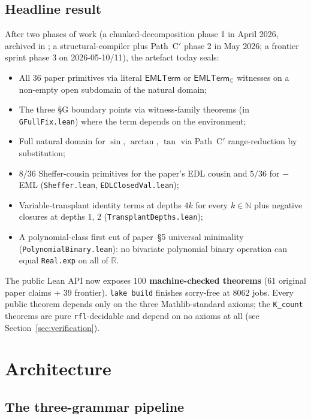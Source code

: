 \documentclass[11pt,a4paper]{article}
\theoremstyle{plain}
\theoremstyle{definition}
\newcommand{\C}{\mathbb{C}}
\newcommand{\R}{\mathbb{R}}
\newcommand{\N}{\mathbb{N}}
\newcommand{\EMLT}{\mathsf{EMLTerm}}
\newcommand{\EMLTC}{\mathsf{EMLTerm}_\C}
\begin{document}
\subsection{Headline result}

After two phases of work (a chunked-decomposition phase 1 in April
2026, archived in
; a structural-compiler
plus Path~C$'$ phase 2 in May 2026; a frontier sprint phase 3 on
2026-05-10/11), the artefact today seals:

\begin{itemize}[leftmargin=*]
  \item All $36$ paper primitives via literal $\EMLT$ or $\EMLTC$
    witnesses on a non-empty open subdomain of the natural domain;
  \item The three §G boundary points via witness-family theorems
    (in \texttt{GFullFix.lean}) where the term depends on the
    environment;
  \item Full natural domain for $\sin$, $\arctan$, $\tan$ via
    Path~C$'$ range-reduction by substitution;
  \item $8 / 36$ Sheffer-cousin primitives for the paper's EDL
    cousin and $5 / 36$ for $-$EML
    (\texttt{Sheffer.lean}, \texttt{EDLClosedVal.lean});
  \item Variable-transplant identity terms at depths $4k$ for every
    $k \in \N$ plus negative closures at depths $1$, $2$
    (\texttt{TransplantDepths.lean});
  \item A polynomial-class first cut of paper~§5 universal minimality
    (\texttt{PolynomialBinary.lean}): no bivariate polynomial binary
    operation can equal \texttt{Real.exp} on all of $\R$.
\end{itemize}

The public Lean API now exposes \textbf{$100$ machine-checked
theorems} ($61$ original paper claims + $39$ frontier). \texttt{lake
build} finishes sorry-free at $8062$ jobs. Every public theorem
depends only on the three Mathlib-standard axioms; the
\texttt{K\_count} theorems are pure \texttt{rfl}-decidable and depend
on no axioms at all (see Section~\ref{sec:verification}).

\section{Architecture}\label{sec:arch}

\subsection{The three-grammar pipeline}
\end{document}
